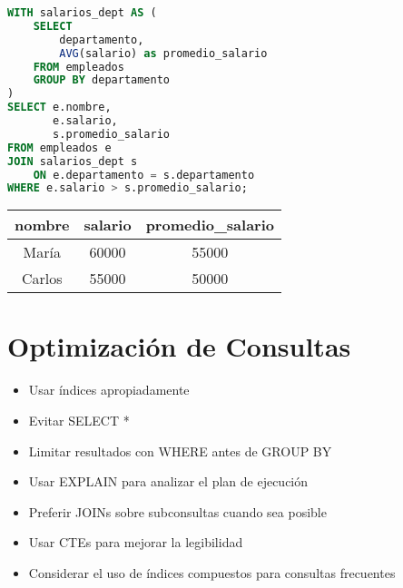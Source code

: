 \documentclass[12pt]{article}
\begin{document}
\begin{lstlisting}[language=SQL]
WITH salarios_dept AS (
    SELECT 
        departamento,
        AVG(salario) as promedio_salario
    FROM empleados
    GROUP BY departamento
)
SELECT e.nombre,
       e.salario,
       s.promedio_salario
FROM empleados e
JOIN salarios_dept s 
    ON e.departamento = s.departamento
WHERE e.salario > s.promedio_salario;
\end{lstlisting}

\begin{center}
\begin{tabular}{ccc}
\toprule
nombre & salario & promedio\_salario \\
\midrule
María & 60000 & 55000 \\
Carlos & 55000 & 50000 \\
\bottomrule
\end{tabular}
\end{center}

\section{Optimización de Consultas}
\begin{itemize}
    \item Usar índices apropiadamente
    \item Evitar SELECT *
    \item Limitar resultados con WHERE antes de GROUP BY
    \item Usar EXPLAIN para analizar el plan de ejecución
    \item Preferir JOINs sobre subconsultas cuando sea posible
    \item Usar CTEs para mejorar la legibilidad
    \item Considerar el uso de índices compuestos para consultas frecuentes
\end{itemize}
\end{document}
